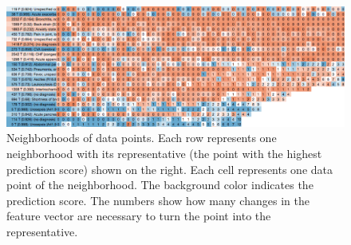 \begin{figure}
\centering
\includegraphics[width=\linewidth]{figs/current/adj_top}
\caption{
Neighborhoods of data points.
Each row represents one neighborhood with its representative (the point with the
highest prediction score) shown on the right.
Each cell represents one data point of the neighborhood.
The background color indicates the prediction score.
The numbers show how many changes in the feature vector are necessary to turn the
point into the representative.
}
\label{figs:current_adj}
\end{figure}